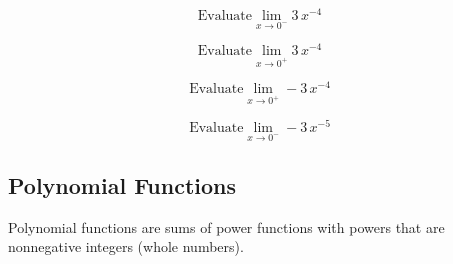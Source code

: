 \documentclass{ximera}
\begin{document}
\begin{question}

\[ \text{Evaluate} \lim_{x \to 0^-} 3 \, x^{-4} \]

\begin{multipleChoice}
\choice {$-\infty$}
\choice [correct]{$\infty$}
\end{multipleChoice}
\end{question}




\begin{question}

\[ \text{Evaluate} \lim_{x \to 0^+} 3 \, x^{-4} \]

\begin{multipleChoice}
\choice {$-\infty$}
\choice [correct]{$\infty$}
\end{multipleChoice}
\end{question}




\begin{question}

\[ \text{Evaluate} \lim_{x \to 0^+} -3 \, x^{-4} \]

\begin{multipleChoice}
\choice [correct]{$-\infty$}
\choice {$\infty$}
\end{multipleChoice}
\end{question}




\begin{question}

\[ \text{Evaluate} \lim_{x \to 0^-} -3 \, x^{-5} \]

\begin{multipleChoice}
\choice {$-\infty$}
\choice [correct]{$\infty$}
\end{multipleChoice}
\end{question}




















\subsection{Polynomial Functions}


Polynomial functions are sums of power functions with powers that are nonnegative integers (whole numbers).
\end{document}
